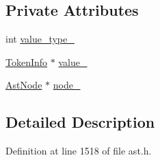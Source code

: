 \subsection*{Private Attributes}
\begin{DoxyCompactItemize}
\item 
int \hyperlink{classmocha_1_1_value_node_ade40c9a57efc8a52d7fea62c8928bae2}{value\_\-type\_\-}
\item 
\hyperlink{classmocha_1_1_token_info}{TokenInfo} $\ast$ \hyperlink{classmocha_1_1_value_node_ab6bf0f86a8bf0d7ce78ab9d6e83d7676}{value\_\-}
\item 
\hyperlink{classmocha_1_1_ast_node}{AstNode} $\ast$ \hyperlink{classmocha_1_1_value_node_af561adfe0e09996246d7f492dfe20e29}{node\_\-}
\end{DoxyCompactItemize}


\subsection{Detailed Description}


Definition at line 1518 of file ast.h.



